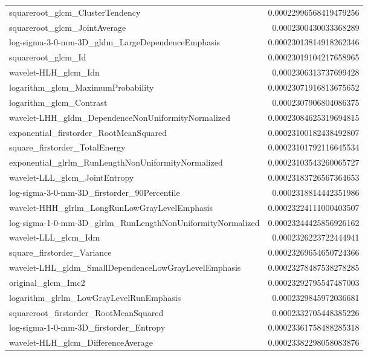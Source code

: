 {\begin{xltabular}[H]{\textwidth}{X r}
        squareroot\_glcm\_ClusterTendency & 0.00022996568419479256 \\
        squareroot\_glcm\_JointAverage & 0.0002300430033368289 \\
        log-sigma-3-0-mm-3D\_gldm\_LargeDependenceEmphasis & 0.00023013814918262346 \\
        squareroot\_glcm\_Id & 0.00023019104217658965 \\
        wavelet-HLH\_glcm\_Idn & 0.0002306313737699428 \\
        logarithm\_glcm\_MaximumProbability & 0.00023071916813675652 \\
        logarithm\_glcm\_Contrast & 0.0002307906804086375 \\
        wavelet-LHH\_gldm\_DependenceNonUniformityNormalized & 0.00023084625319694815 \\
        exponential\_firstorder\_RootMeanSquared & 0.00023100182438492807 \\
        square\_firstorder\_TotalEnergy & 0.00023101792116645534 \\
        exponential\_glrlm\_RunLengthNonUniformityNormalized & 0.00023103543260065727 \\
        wavelet-LLL\_glcm\_JointEntropy & 0.00023183726567364653 \\
        log-sigma-3-0-mm-3D\_firstorder\_90Percentile & 0.0002318814442351986 \\
        wavelet-HHH\_glrlm\_LongRunLowGrayLevelEmphasis & 0.00023224111000403507 \\
        log-sigma-1-0-mm-3D\_glrlm\_RunLengthNonUniformityNormalized & 0.00023244425856926162 \\
        wavelet-LLL\_glcm\_Idm & 0.0002326223722444941 \\
        square\_firstorder\_Variance & 0.00023269654650724366 \\
        wavelet-LHL\_gldm\_SmallDependenceLowGrayLevelEmphasis & 0.00023278487538278285 \\
        original\_glcm\_Imc2 & 0.00023292795547487003 \\
        logarithm\_glrlm\_LowGrayLevelRunEmphasis & 0.0002329845972036681 \\
        squareroot\_firstorder\_RootMeanSquared & 0.0002332705448385226 \\
        log-sigma-1-0-mm-3D\_firstorder\_Entropy & 0.00023361758488285318 \\
        wavelet-HLH\_glcm\_DifferenceAverage & 0.00023382298058083876 \\

\end{xltabular}}
